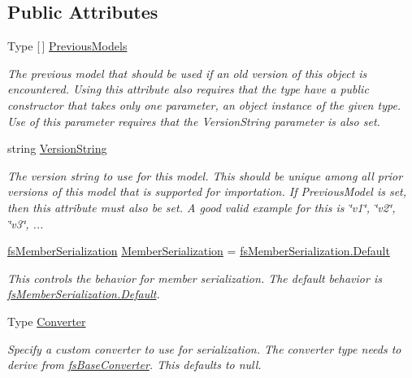 \subsection*{Public Attributes}
\begin{DoxyCompactItemize}
\item 
Type \mbox{[}$\,$\mbox{]} \hyperlink{class_full_serializer_1_1fs_object_attribute_ae82b6c5b9d90688cfa0ff8ecc5b53c9c}{Previous\+Models}
\begin{DoxyCompactList}\small\item\em The previous model that should be used if an old version of this object is encountered. Using this attribute also requires that the type have a public constructor that takes only one parameter, an object instance of the given type. Use of this parameter {\itshape requires} that the Version\+String parameter is also set. \end{DoxyCompactList}\item 
string \hyperlink{class_full_serializer_1_1fs_object_attribute_ac3208d9844485e25429cd4182d34111a}{Version\+String}
\begin{DoxyCompactList}\small\item\em The version string to use for this model. This should be unique among all prior versions of this model that is supported for importation. If Previous\+Model is set, then this attribute must also be set. A good valid example for this is \char`\"{}v1\char`\"{}, \char`\"{}v2\char`\"{}, \char`\"{}v3\char`\"{}, ... \end{DoxyCompactList}\item 
\hyperlink{namespace_full_serializer_ad0dc98cd54a3d07f8c579d82585906f8}{fs\+Member\+Serialization} \hyperlink{class_full_serializer_1_1fs_object_attribute_afcdb79992b507e9e9c04111c6a9edadc}{Member\+Serialization} = \hyperlink{namespace_full_serializer_ad0dc98cd54a3d07f8c579d82585906f8a7a1920d61156abc05a60135aefe8bc67}{fs\+Member\+Serialization.\+Default}
\begin{DoxyCompactList}\small\item\em This controls the behavior for member serialization. The default behavior is \hyperlink{namespace_full_serializer_ad0dc98cd54a3d07f8c579d82585906f8a7a1920d61156abc05a60135aefe8bc67}{fs\+Member\+Serialization.\+Default}. \end{DoxyCompactList}\item 
Type \hyperlink{class_full_serializer_1_1fs_object_attribute_abe3f1e8c04164f6d951c70c15870df71}{Converter}
\begin{DoxyCompactList}\small\item\em Specify a custom converter to use for serialization. The converter type needs to derive from \hyperlink{class_full_serializer_1_1fs_base_converter}{fs\+Base\+Converter}. This defaults to null. \end{DoxyCompactList}\item 

\end{DoxyCompactItemize}
